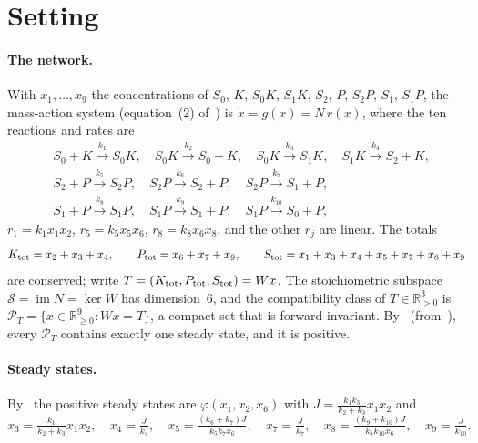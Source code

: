 \documentclass[11pt,a4paper]{report}
\begin{document}
\section{Setting}\label{sec:setting}
\paragraph{The network.} With $x_1,\dots,x_9$ the concentrations of $S_0$, $K$, $S_0K$, $S_1K$, $S_2$, $P$, $S_2P$, $S_1$, $S_1P$, the mass-action system (equation~(2) of~\autocite{CMS2019}) is $\dot x=g(x)=N\,r(x)$, where the ten reactions and rates are
\[
\begin{aligned}
&S_0+K\xrightarrow{k_1}S_0K,\quad S_0K\xrightarrow{k_2}S_0+K,\quad S_0K\xrightarrow{k_3}S_1K,\quad S_1K\xrightarrow{k_4}S_2+K,\\
&S_2+P\xrightarrow{k_5}S_2P,\quad S_2P\xrightarrow{k_6}S_2+P,\quad S_2P\xrightarrow{k_7}S_1+P,\\
&S_1+P\xrightarrow{k_8}S_1P,\quad S_1P\xrightarrow{k_9}S_1+P,\quad S_1P\xrightarrow{k_{10}}S_0+P,
\end{aligned}
\]
$r_1=k_1x_1x_2$, $r_5=k_5x_5x_6$, $r_8=k_8x_6x_8$, and the other $r_j$ are linear. The totals
\[
K_{\rm tot}=x_2+x_3+x_4,\qquad P_{\rm tot}=x_6+x_7+x_9,\qquad S_{\rm tot}=x_1+x_3+x_4+x_5+x_7+x_8+x_9
\]
are conserved; write $T=(K_{\rm tot},P_{\rm tot},S_{\rm tot})=Wx$. The stoichiometric subspace $\mathcal S=\operatorname{im}N=\ker W$ has dimension~6, and the compatibility class of $T\in\mathbb R^3_{>0}$ is $\mathcal P_T=\{x\in\mathbb R^9_{\ge0}:Wx=T\}$, a compact set that is forward invariant. By~\autocite[Prop.~3.1]{CMS2019} (from~\autocite{SK2015}), every $\mathcal P_T$ contains exactly one steady state, and it is positive.

\paragraph{Steady states.} By~\autocite[Prop.~3.2]{CMS2019} the positive steady states are $\varphi(x_1,x_2,x_6)$ with $J=\tfrac{k_1k_3}{k_2+k_3}x_1x_2$ and
\[
x_3=\tfrac{k_1}{k_2+k_3}x_1x_2,\quad x_4=\tfrac{J}{k_4},\quad x_5=\tfrac{(k_6+k_7)J}{k_5k_7x_6},\quad x_7=\tfrac{J}{k_7},\quad x_8=\tfrac{(k_9+k_{10})J}{k_8k_{10}x_6},\quad x_9=\tfrac{J}{k_{10}} .
\]
\end{document}
